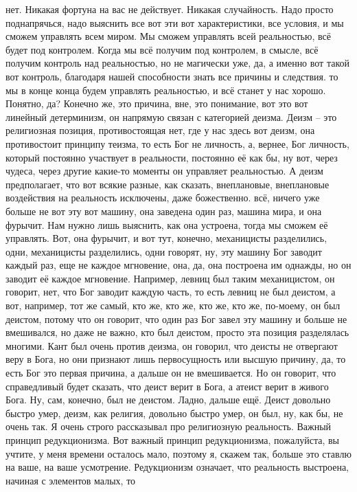 нет. Никакая фортуна на вас не действует. Никакая случайность. Надо просто
поднапрячься, надо выяснить все вот эти вот характеристики, все условия, и мы
сможем управлять всем миром. Мы сможем управлять всей реальностью, всё будет под
контролем. Когда мы всё получим под контролем, в смысле, всё получим контроль
над реальностью, но не магически уже, да, а именно вот такой вот контроль,
благодаря нашей способности знать все причины и следствия. то мы в конце конца
будем управлять реальностью, и всё станет у нас хорошо. Понятно, да? Конечно же,
это причина, вне, это понимание, вот это вот линейный детерминизм, он напрямую
связан с категорией деизма. Деизм – это религиозная позиция, противостоящая нет,
где у нас здесь вот деизм, она противостоит принципу теизма, то есть Бог не
личность, а, вернее, Бог личность, который постоянно участвует в реальности,
постоянно её как бы, ну вот, через чудеса, через другие какие-то моменты он
управляет реальностью. А деизм предполагает, что вот всякие разные, как сказать,
внеплановые, внеплановые воздействия на реальность исключены, даже божественно.
всё, ничего уже больше не вот эту вот машину, она заведена один раз, машина
мира, и она фурычит. Нам нужно лишь выяснить, как она устроена, тогда мы сможем
её управлять. Вот, она фурычит, и вот тут, конечно, механицисты разделились,
одни, механицисты разделились, одни говорят, ну, эту машину Бог заводит каждый
раз, еще не каждое мгновение, она, да, она построена им однажды, но он заводит
её каждое мгновение. Например, левниц был таким механицистом, он говорит, нет,
что Бог заводит каждую часть, то есть левниц не был деистом, а вот, например,
тот же самый, кто же, кто же, кто же, кто же, по-моему, он был деистом, потому
что он говорит, что один раз Бог завел эту машину и больше не вмешивался, но
даже не важно, кто был деистом, просто эта позиция разделялась многими. Кант был
очень против деизма, он говорил, что деисты не отвергают веру в Бога, но они
признают лишь первосущность или высшую причину, да, то есть Бог это первая
причина, а дальше он не вмешивается. Но он говорит, что справедливый будет
сказать, что деист верит в Бога, а атеист верит в живого Бога. Ну, сам, конечно,
был не деистом. Ладно, дальше ещё. Деист довольно быстро умер, деизм, как
религия, довольно быстро умер, он был, ну, как бы, не очень так. Я очень строго
рассказывал про религиозную реальность. Важный принцип редукционизма. Вот важный
принцип редукционизма, пожалуйста, вы учтите, у меня времени осталось мало,
поэтому я, скажем так, больше это ставлю на ваше, на ваше усмотрение.
Редукционизм означает, что реальность выстроена, начиная с элементов малых, то
